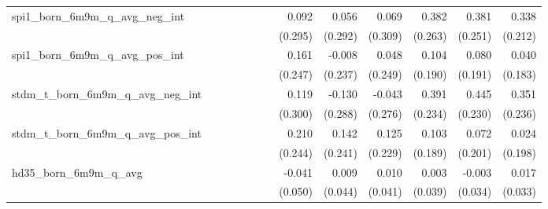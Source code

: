 \begin{tabular}{lrrrrrrrrrrrr}
spi1\_born\_6m9m\_q\_avg\_neg\_int          &              &              &              &              &              &              &        0.092 &        0.056 &        0.069 &        0.382 &        0.381 &        0.338 \\ 
                                            &              &              &              &              &              &              &      (0.295) &      (0.292) &      (0.309) &      (0.263) &      (0.251) &      (0.212) \\ 
spi1\_born\_6m9m\_q\_avg\_pos\_int          &              &              &              &              &              &              &        0.161 &       -0.008 &        0.048 &        0.104 &        0.080 &        0.040 \\ 
                                            &              &              &              &              &              &              &      (0.247) &      (0.237) &      (0.249) &      (0.190) &      (0.191) &      (0.183) \\ 
stdm\_t\_born\_6m9m\_q\_avg\_neg\_int       &              &              &              &              &              &              &        0.119 &       -0.130 &       -0.043 &        0.391 &        0.445 &        0.351 \\ 
                                            &              &              &              &              &              &              &      (0.300) &      (0.288) &      (0.276) &      (0.234) &      (0.230) &      (0.236) \\ 
stdm\_t\_born\_6m9m\_q\_avg\_pos\_int       &              &              &              &              &              &              &        0.210 &        0.142 &        0.125 &        0.103 &        0.072 &        0.024 \\ 
                                            &              &              &              &              &              &              &      (0.244) &      (0.241) &      (0.229) &      (0.189) &      (0.201) &      (0.198) \\ 
hd35\_born\_6m9m\_q\_avg                    &              &              &              &              &              &              &       -0.041 &        0.009 &        0.010 &        0.003 &       -0.003 &        0.017 \\ 
                                            &              &              &              &              &              &              &      (0.050) &      (0.044) &      (0.041) &      (0.039) &      (0.034) &      (0.033) \\ 

\end{tabular}
